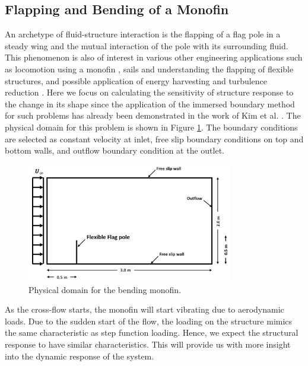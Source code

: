 \subsection{Flapping and Bending of a Monofin}
An archetype of fluid-structure interaction is the flapping of a flag pole in a steady wing and the mutual interaction of the pole with its surrounding fluid. This phenomenon is also of interest in various other engineering applications such as locomotion using a monofin \cite{luersen2006computationally}, sails and understanding the flapping of flexible structures, and possible application of energy harvesting \cite{allen2001energy} and turbulence reduction \cite{shen2003turbulent}. Here we focus on calculating the sensitivity of structure response to the change in its shape since the application of the immersed boundary method for such problems has already been demonstrated in the work of Kim et al. \cite{kim2007penalty}. The physical domain for this problem is shown in Figure \ref{fig:C5_flagPolePhysical}. The boundary conditions are selected as constant velocity at inlet, free slip boundary conditions on top and bottom walls, and outflow boundary condition at the outlet.
%
\begin{figure}[H]
    \centering
    \includegraphics[width=9.00cm]{Chapter_5/figure/flagPole_domain_shape.jpg}
    \caption{Physical domain for the bending monofin.}
    \label{fig:C5_flagPolePhysical}
\end{figure}
%
As the cross-flow starts, the monofin will start vibrating due to aerodynamic loads. Due to the sudden start of the flow, the loading on the structure mimics the same characteristic as step function loading. Hence, we expect the structural response to have similar characteristics. This will provide us with more insight into the dynamic response of the system. 


